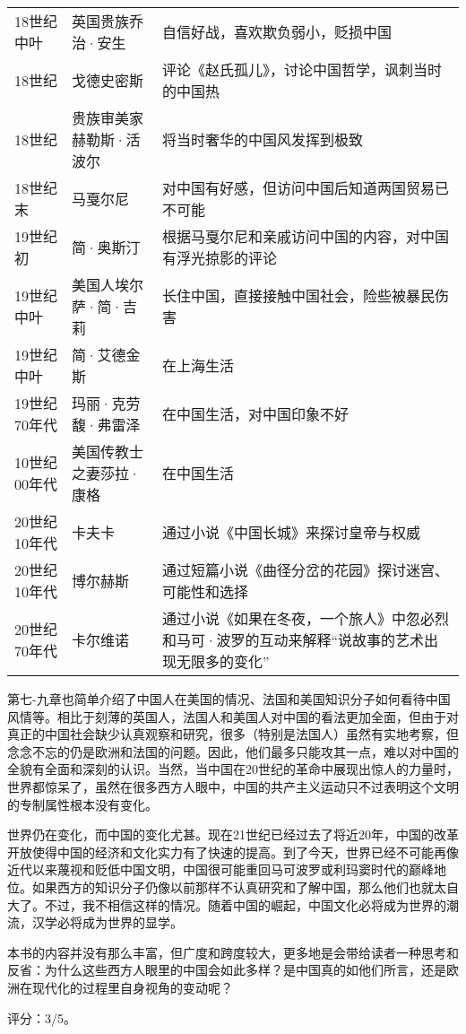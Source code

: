 \begin{longtable}{p{}|p{}|p{}}
18世纪中叶 & 英国贵族乔治·安生 & 自信好战，喜欢欺负弱小，贬损中国 \\
18世纪 & 戈德史密斯 & 评论《赵氏孤儿》，讨论中国哲学，讽刺当时的中国热 \\
18世纪 & 贵族审美家赫勒斯·活波尔 & 将当时奢华的中国风发挥到极致 \\
18世纪末 & 马戛尔尼 & 对中国有好感，但访问中国后知道两国贸易已不可能 \\ 
19世纪初 & 简·奥斯汀 & 根据马戛尔尼和亲戚访问中国的内容，对中国有浮光掠影的评论 \\
19世纪中叶 & 美国人埃尔萨·简·吉莉 & 长住中国，直接接触中国社会，险些被暴民伤害 \\
19世纪中叶 & 简·艾德金斯 & 在上海生活 \\
19世纪70年代 & 玛丽·克劳馥·弗雷泽 & 在中国生活，对中国印象不好 \\
10世纪00年代 & 美国传教士之妻莎拉·康格 & 在中国生活 \\
20世纪10年代 & 卡夫卡 & 通过小说《中国长城》来探讨皇帝与权威 \\
20世纪10年代 & 博尔赫斯 & 通过短篇小说《曲径分岔的花园》探讨迷宫、可能性和选择 \\
20世纪70年代 & 卡尔维诺 & 通过小说《如果在冬夜，一个旅人》中忽必烈和马可·波罗的互动来解释“说故事的艺术出现无限多的变化” \\
\hline
\end{longtable}

第七-九章也简单介绍了中国人在美国的情况、法国和美国知识分子如何看待中国风情等。相比于刻薄的英国人，法国人和美国人对中国的看法更加全面，但由于对真正的中国社会缺少认真观察和研究，很多（特别是法国人）虽然有实地考察，但念念不忘的仍是欧洲和法国的问题。因此，他们最多只能攻其一点，难以对中国的全貌有全面和深刻的认识。当然，当中国在20世纪的革命中展现出惊人的力量时，世界都惊呆了，虽然在很多西方人眼中，中国的共产主义运动只不过表明这个文明的专制属性根本没有变化。

世界仍在变化，而中国的变化尤甚。现在21世纪已经过去了将近20年，中国的改革开放使得中国的经济和文化实力有了快速的提高。到了今天，世界已经不可能再像近代以来蔑视和贬低中国文明，中国很可能重回马可波罗或利玛窦时代的巅峰地位。如果西方的知识分子仍像以前那样不认真研究和了解中国，那么他们也就太自大了。不过，我不相信这样的情况。随着中国的崛起，中国文化必将成为世界的潮流，汉学必将成为世界的显学。

本书的内容并没有那么丰富，但广度和跨度较大，更多地是会带给读者一种思考和反省：为什么这些西方人眼里的中国会如此多样？是中国真的如他们所言，还是欧洲在现代化的过程里自身视角的变动呢？

评分：3/5。